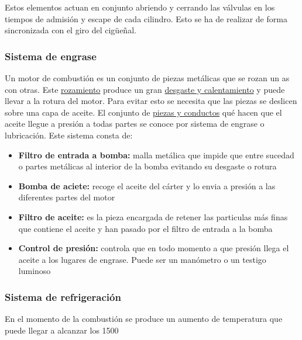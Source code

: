 \documentclass[a4paper,12pt,oneside]{article}
\begin{document}
Estos elementos actuan en conjunto abriendo y cerrando las válvulas en los
tiempos de admisión y escape de cada cilindro. Esto se ha de realizar de forma
sincronizada con el giro del cigüeñal. 

\subsubsection{Sistema de engrase}
\label{sec:org5c6e891}
Un motor de combustión es un conjunto de piezas metálicas que se rozan un as con
otras. Este \uline{rozamiento} produce un gran \uline{desgaste y calentamiento} y puede
llevar a la rotura del motor. Para evitar esto se necesita que las piezas se
deslicen sobre una capa de aceite. El conjunto de \uline{piezas y conductos} qué hacen
que el aceite llegue a presión a todas partes se conoce por sistema de engrase o
lubricación. Este sistema consta de:
\begin{itemize}
\item \textbf{Filtro de entrada a bomba:} malla metálica que impide que entre sucedad o
partes metálicas al interior de la bomba evitando su desgaste o rotura
\item \textbf{Bomba de aciete:} recoge el aceite del cárter y lo envia a presión a las
diferentes partes del motor
\item \textbf{Filtro de aceite:} es la pieza encargada de retener las particulas más finas
que contiene el aceite y han pasado por el filtro de entrada a la bomba
\item \textbf{Control de presión:} controla que en todo momento a que presión llega el
aceite a los lugares de engrase. Puede ser un manómetro o un testigo luminoso
\end{itemize}
\subsubsection{Sistema de refrigeración}
\label{sec:org896da7a}
En el momento de la combustión se produce un aumento de temperatura que puede
llegar a alcanzar los 1500\textdegree{}
\end{document}

